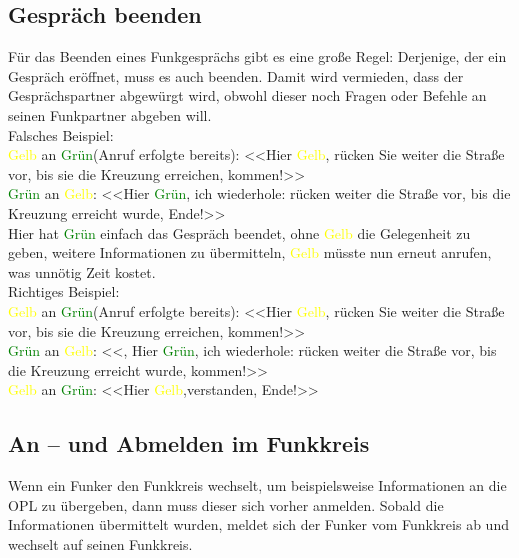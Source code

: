 \subsection{Gespräch beenden}
Für das Beenden eines Funkgesprächs gibt es eine große Regel: Derjenige, der ein Gespräch eröffnet, muss es auch beenden. Damit wird vermieden, dass der Gesprächspartner abgewürgt wird, obwohl dieser noch Fragen oder Befehle an seinen Funkpartner abgeben will. \\
Falsches Beispiel: \\
\textcolor{yellow}{Gelb} an \textcolor{green}{Grün}(Anruf erfolgte bereits): <<Hier \textcolor{yellow}{Gelb}, rücken Sie weiter die Straße vor, bis sie die Kreuzung erreichen, kommen!>>  \\
\textcolor{green}{Grün} an \textcolor{yellow}{Gelb}: <<Hier \textcolor{green}{Grün}, ich wiederhole: rücken weiter die Straße vor, bis die Kreuzung erreicht wurde, Ende!>> \\
Hier hat \textcolor{green}{Grün} einfach das Gespräch beendet, ohne \textcolor{yellow}{Gelb} die Gelegenheit zu geben, weitere Informationen zu übermitteln, \textcolor{yellow}{Gelb} müsste nun erneut anrufen, was unnötig Zeit kostet. \\
Richtiges Beispiel: \\
\textcolor{yellow}{Gelb} an \textcolor{green}{Grün}(Anruf erfolgte bereits): <<Hier \textcolor{yellow}{Gelb}, rücken Sie weiter die Straße vor, bis sie die Kreuzung erreichen, kommen!>> \\
\textcolor{green}{Grün} an \textcolor{yellow}{Gelb}: <<, Hier \textcolor{green}{Grün}, ich wiederhole: rücken weiter die Straße vor, bis die Kreuzung erreicht wurde, kommen!>> \\
\textcolor{yellow}{Gelb} an \textcolor{green}{Grün}: <<Hier \textcolor{yellow}{Gelb},verstanden, Ende!>> \\

\subsection{An – und Abmelden im Funkkreis} \label{AnAbmeldenImFunk}
Wenn ein Funker den Funkkreis wechselt, um beispielsweise Informationen an die OPL zu übergeben, dann muss dieser sich vorher anmelden. Sobald die Informationen übermittelt wurden, meldet sich der Funker vom Funkkreis ab und wechselt auf seinen Funkkreis. \\

